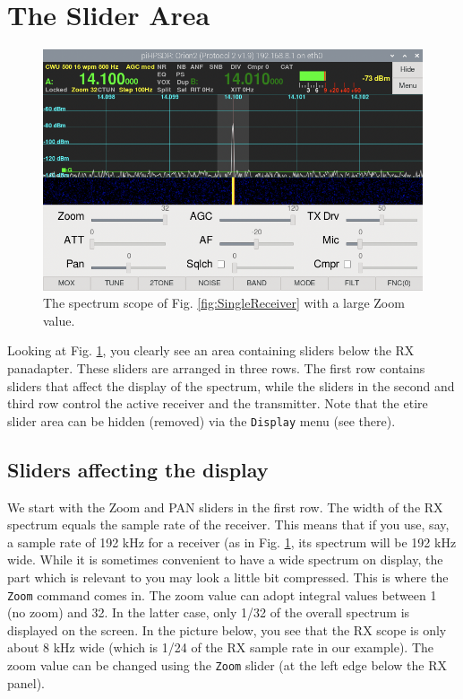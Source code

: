 \documentclass[12pt]{book}
\def\rett#1{\texttt{\color{red}#1}}
\def\bltt#1{\texttt{\color{blue}#1}}
\begin{document}
\section{The Slider Area}
\label{sec:SliderArea}
\begin{figure}[ht!]
\center
\includegraphics[scale=0.45]{ZoomPan.png}
\caption{The spectrum scope of Fig. \ref{fig:SingleReceiver} with a
large Zoom value.}
\label{fig:zoom}
\end{figure}
Looking at Fig. \ref{fig:zoom}, you clearly see an area containing sliders below
the RX panadapter. These sliders are arranged in three rows. The first row contains
sliders that affect the display of the spectrum, while the sliders in the second and
third row control the active receiver and the transmitter.
Note that the etire slider area can be hidden (removed) via the \bltt{Display} menu (see there).

\subsection{Sliders affecting the display}
We start with the Zoom and PAN sliders in the first row.
The width of the RX spectrum equals the sample rate
of the receiver. This means that if you use, say,
a sample rate of 192 kHz for a receiver (as in Fig. \ref{fig:zoom},
 its spectrum
will be 192 kHz wide. While it is sometimes convenient to
have a wide spectrum on display, the part which is relevant to
you may look a little bit
compressed. This is where the \bltt{Zoom} command
comes in. The zoom value can adopt integral values between
1 (no zoom) and 32. In the latter case, only 1/32 of the
overall spectrum is displayed on the screen. In the
picture below, you see that the RX scope is only about 8 kHz
wide (which is 1/24 of the RX sample rate in our
example).  The zoom value can be changed using the \rett{Zoom}
slider (at the left edge below the RX panel).
\end{document}
